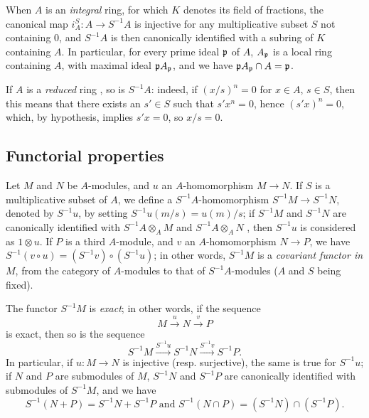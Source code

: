 \begin{env}[1.2.7]
\label{0.1.2.7}
When $A$ is an \emph{integral} ring, for which $K$ denotes its field of
fractions, the canonical map $i_A^S:A\to S^{-1}A$ is injective for any
multiplicative subset $S$ not containing $0$, and $S^{-1}A$ is then canonically identified
with a subring of $K$ containing $A$. In particular, for every prime
ideal $\mathfrak{p}$ of $A$, $A_\mathfrak{p}$ is a local ring containing $A$,
with maximal ideal $\mathfrak{p}A_\mathfrak{p}$, and we have
$\mathfrak{p}A_\mathfrak{p}\cap A=\mathfrak{p}$.
\end{env}

\begin{env}[1.2.8]
\label{0.1.2.8}
If $A$ is a \emph{reduced} ring , so is $S^{-1}A$: indeed, if
$(x/s)^n=0$ for $x\in A$, $s\in S$, then this means that there exists an
$s'\in S$ such that $s' x^n=0$, hence $(s' x)^n=0$, which, by hypothesis, implies
$s' x=0$, so $x/s=0$.
\end{env}

\subsection{Functorial properties}
\label{subsection:func-ring-of-fractions}

\begin{env}[1.3.1]
\label{0.1.3.1}
Let $M$ and $N$ be $A$-modules, and $u$ an $A$-homomorphism $M\to N$. If $S$ is a
multiplicative subset of $A$, we define a $S^{-1}A$-homomorphism
$S^{-1}M\to S^{-1}N$, denoted by $S^{-1}u$, by setting $S^{-1}u(m/s)=u(m)/s$; if
$S^{-1}M$ and $S^{-1}N$ are canonically identified with $S^{-1}A\otimes_A M$ and
$S^{-1}A\otimes_A N$ , then $S^{-1}u$ is considered as $1\otimes u$.
If $P$ is a third $A$-module, and $v$ an $A$-homomorphism $N\to P$, we have
$S^{-1}(v\circ u)=(S^{-1}v)\circ(S^{-1}u)$; in other words, $S^{-1}M$ is a
\emph{covariant functor in $M$}, from the category of $A$-modules to that of
$S^{-1}A$-modules ($A$ and $S$ being fixed).
\end{env}

\begin{env}[1.3.2]
\label{0.1.3.2}
The functor $S^{-1}M$ is \emph{exact}; in other words, if the sequence
\[
  M\xrightarrow{u}N\xrightarrow{v}P
\]
is exact, then so is the sequence
\[
  S^{-1}M\xrightarrow{S^{-1}u}S^{-1}N\xrightarrow{S^{-1}v}S^{-1}P.
\]
In particular, if $u:M\to N$ is injective (resp. surjective), the same is true
for $S^{-1}u$;
if $N$ and $P$ are submodules of $M$, $S^{-1}N$ and $S^{-1}P$ are canonically identified with submodules of $S^{-1}M$, and we have
\[
  S^{-1}(N+P)=S^{-1}N+S^{-1}P\text{ and }S^{-1}(N\cap P)=(S^{-1}N)\cap(S^{-1}P).
\]
\end{env}

